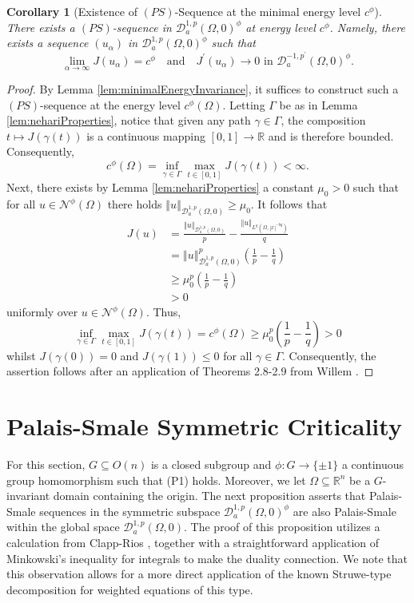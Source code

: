 \documentclass[10pt, reqno]{amsart}
\newcommand{\RR}{\mathbb{R}}
\newcommand{\Om}{\Omega}
\newcommand{\abs}[1]{\left\vert #1 \right\vert}
\newcommand{\norm}[1]{\left\Vert #1 \right\Vert}
\newcommand{\D}{\mathcal{D}}
\newcommand{\N}{\mathcal{N}}
\numberwithin{equation}{section}
\theoremstyle{definition}
\theoremstyle{remark}
\theoremstyle{plain}
\newtheorem{cor}[prop]{Corollary}
\begin{document}
	
	\begin{cor}[Existence of $(PS)$-Sequence at the minimal energy level $c^\phi$]\label{cor:PSExistence}
		There exists a $(PS)$-sequence in $\D_a^{1,p}(\Om,0)^\phi$ at energy level $c^\phi$. Namely, there exists a sequence $(u_\alpha)$ in $\D_a^{1,p}(\Om,0)^\phi$ such that
		\[
		\lim_{\alpha \to \infty} J(u_\alpha) = c^\phi \quad \text{and} \quad J^\prime(u_\alpha) \to 0 \text{ in } \D_a^{-1,p^\prime}(\Om,0)^\phi. 
		\]
	\end{cor}
	\begin{proof}
		By Lemma \ref{lem:minimalEnergyInvariance}, it suffices to construct such a $(PS)$-sequence at the energy level $c^\phi(\Om)$.	Letting $\Gamma$ be as in Lemma \ref{lem:nehariProperties}, notice that given any path $\gamma \in \Gamma$, the composition $t \mapsto J(\gamma(t))$ is a continuous mapping $[0,1] \to \RR$ and is therefore bounded. Consequently,
		\[	
		c^\phi(\Om) = \inf_{\gamma \in \Gamma} \max_{t \in [0,1]} J(\gamma(t)) < \infty.
		\]
		Next, there exists by Lemma \ref{lem:nehariProperties} a constant $\mu_0 > 0$ such that for all $u \in \N^\phi(\Om)$ there holds $\norm{u}_{\D_a^{1,p}(\Om,0)} \ge \mu_0$. It follows that
		\begin{align*}
			J(u) &= \frac{\norm{u}_{\D_a^{1,p}(\Om,0)} }{p} - \frac{\norm{u}_{L^q(\Om,\abs{x}^{-bq})} }{q}\\
			&= \norm{u}^p_{\D^{1,p}_a(\Om,0)} \left( \frac{1}{p}- \frac{1}{q}\right)\\
			&\ge \mu_0^p\left( \frac{1}{p}- \frac{1}{q}\right)\\
			& > 0
		\end{align*}
		uniformly over $u \in \N^\phi(\Om)$. Thus, 
		\[
		\inf_{\gamma \in \Gamma} \max_{t \in [0,1]} J(\gamma(t))= c^\phi(\Om) \ge \mu_0^p\left( \frac{1}{p}- \frac{1}{q}\right) > 0
		\]
		whilst $J(\gamma(0)) = 0$ and $J(\gamma(1)) \le 0$ for all $\gamma \in \Gamma$. Consequently, the assertion follows after an application of Theorems 2.8-2.9 from Willem \cite{willem2012minimax}.
	\end{proof}
	
	
	\section{Palais-Smale Symmetric Criticality}
	
	For this section, $G \subseteq O(n)$ is a closed subgroup and $\phi : G\to\{\pm 1\}$ a continuous group homomorphism such that (P1) holds. Moreover, we let $\Om \subseteq \mathbb{R}^n$ be a $G$-invariant domain containing the origin. The next proposition asserts that Palais-Smale sequences in the symmetric subspace $\D_a^{1,p}(\Om,0)^\phi$ are also Palais-Smale within the global space $\D_a^{1,p}(\Om, 0)$. The proof of this proposition utilizes a calculation from Clapp-Rios \cite[Lemma A.1]{clappRios}, together with a straightforward application of Minkowski's inequality for integrals to make the duality connection. We note that this observation allows for a more direct application of the known Struwe-type decomposition for weighted equations of this type.
	
\end{document}
